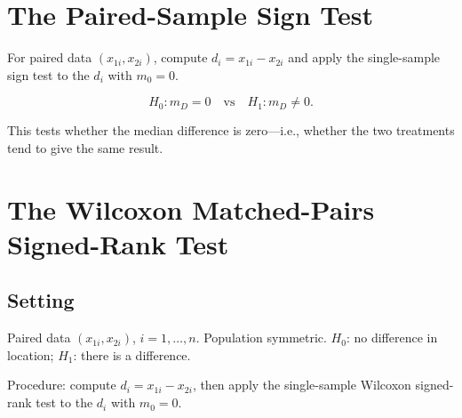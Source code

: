 \documentclass[12pt, a4paper, oneside]{book}
\theoremstyle{definition}
\theoremstyle{plain}
\theoremstyle{remark}
\begin{document}
\section{The Paired-Sample Sign Test}
\label{sec:sign-paired}

For paired data $(x_{1i},x_{2i})$, compute $d_i=x_{1i}-x_{2i}$ and apply
the single-sample sign test to the $d_i$ with $m_0=0$.

\[
  H_0: m_D = 0 \quad\text{vs}\quad H_1: m_D\ne0.
\]

This tests whether the median difference is zero---i.e., whether the two
treatments tend to give the same result.

\section{The Wilcoxon Matched-Pairs Signed-Rank Test}
\label{sec:wilcoxon-paired}

\subsection{Setting}

Paired data $(x_{1i},x_{2i})$, $i=1,\ldots,n$.  Population symmetric.
$H_0$: no difference in location; $H_1$: there is a difference.

Procedure: compute $d_i=x_{1i}-x_{2i}$, then apply the single-sample
Wilcoxon signed-rank test to the $d_i$ with $m_0=0$.
\end{document}
